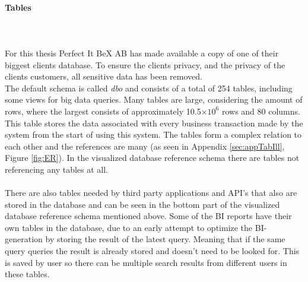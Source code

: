\documentclass{cslthse-msc}
\begin{document}
\paragraph*{Tables}\mbox{}\\\\
For this thesis Perfect It BeX AB has made available a copy of one of their biggest clients database. To ensure the clients privacy, and the privacy of the clients customers, all sensitive data has been removed. \\ 
The default schema is called \textit{dbo} and consists of a total of 254 tables, including some views for big data queries. Many tables are large, considering the amount of rows, where the largest consists of approximately 10.5$\times 10^6$ rows and 80 columns. This table stores the data associated with every business transaction made by the system from the start of using this system. The tables form a complex relation to each other and the references are many (as seen in Appendix \ref{sec:appTabIll}, Figure \ref{fig:ER}). In the visualized database reference schema there are tables not referencing any tables at all.\\\\
There are also tables needed by third party applications and API's that also are stored in the database and can be seen in the bottom part of the visualized database reference schema mentioned above. Some of the BI reports have their own tables in the database, due to an early attempt to optimize the BI-generation by storing the result of the latest query. Meaning that if the same query queries the result is already stored and doesn't need to be looked for. This is saved by user so there can be multiple search results from different users in these tables.
\end{document}
